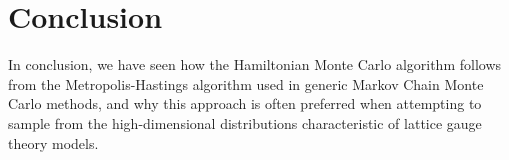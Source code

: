 \documentclass[main.tex]{subfiles}
\begin{document}

%
%

\section{Conclusion}%
\label{sec:l2hmc_conclusion}
In conclusion, we have seen how the Hamiltonian Monte Carlo algorithm follows from the Metropolis-Hastings algorithm
used in generic Markov Chain Monte Carlo methods, and why this approach is often preferred when attempting to sample
from the high-dimensional distributions characteristic of lattice gauge theory models.
\end{document}
